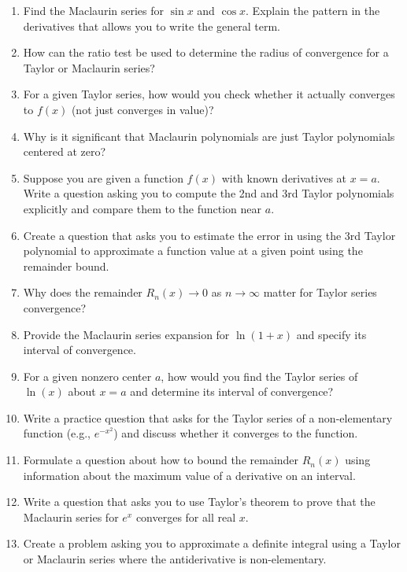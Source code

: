 \begin{enumerate}
\item Find the Maclaurin series for \(\sin x\) and \(\cos x\). Explain the pattern in the derivatives that allows you to write the general term.

\item How can the ratio test be used to determine the radius of convergence for a Taylor or Maclaurin series?

\item For a given Taylor series, how would you check whether it actually converges to \(f(x)\) (not just converges in value)?

\item Why is it significant that Maclaurin polynomials are just Taylor polynomials centered at zero?

\item Suppose you are given a function \(f(x)\) with known derivatives at \(x=a\). Write a question asking you to compute the 2nd and 3rd Taylor polynomials explicitly and compare them to the function near \(a\).

\item Create a question that asks you to estimate the error in using the 3rd Taylor polynomial to approximate a function value at a given point using the remainder bound.

\item Why does the remainder \(R_n(x)\to 0\) as \(n\to\infty\) matter for Taylor series convergence?

\item Provide the Maclaurin series expansion for \(\ln(1+x)\) and specify its interval of convergence.

\item For a given nonzero center \(a\), how would you find the Taylor series of \(\ln(x)\) about \(x=a\) and determine its interval of convergence?

\item Write a practice question that asks for the Taylor series of a non-elementary function (e.g., \(e^{-x^2}\)) and discuss whether it converges to the function.

\item Formulate a question about how to bound the remainder \(R_n(x)\) using information about the maximum value of a derivative on an interval.

\item Write a question that asks you to use Taylor's theorem to prove that the Maclaurin series for \(e^x\) converges for all real \(x\).

\item Create a problem asking you to approximate a definite integral using a Taylor or Maclaurin series where the antiderivative is non-elementary.

\end{enumerate}
